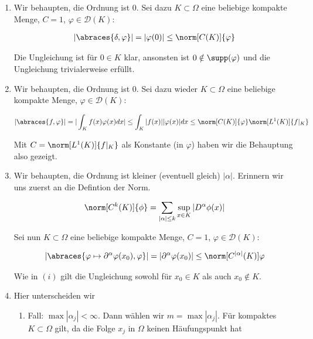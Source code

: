 \begin{solution}

\begin{enumerate}[label = (\roman*)]
  \item Wir behaupten, die Ordnung ist $0$. Sei dazu $K \subset \Omega$ eine beliebige kompakte Menge, $C=1$, $\varphi \in \mathcal{D}(K)$:

  \begin{align*}
    |\abraces{\delta, \varphi}|
    = |\varphi(0)|
    \leq
    \norm[C(K)]{\varphi}
  \end{align*}

  Die Ungleichung ist für $0 \in K$ klar, ansonsten ist $0 \notin \supp(\varphi)$ und die Ungleichung trivialerweise erfüllt.


  \item Wir behaupten, die Ordnung ist $0$. Sei dazu wieder $K \subset \Omega$ eine beliebige kompakte Menge, $\varphi \in \mathcal{D}(K)$:

  \begin{align*}
      |\abraces{f, \varphi}|
      =
      |\int_K f(x) \varphi(x) dx|
      \leq
      \int_K |f(x)| |\varphi(x)| dx
      \leq
      \norm[C(K)]{\varphi} \norm[L^1 (K)]{f|_K}
  \end{align*}

  Mit $C = \norm[L^1 (K)]{f|_K}$ als Konstante (in $\varphi$) haben wir die Behauptung also gezeigt.

  \item Wir behaupten, die Ordnung ist kleiner (eventuell gleich) $|\alpha|$.
  Erinnern wir uns zuerst an die Defintion der Norm.

  \begin{align*}
    \norm[C^k (K)]{\phi}
    =
    \sum_{|\alpha| \leq k} \sup_{x \in K} |D^\alpha \phi(x)|
  \end{align*}

  Sei nun $K \subset \Omega$ eine beliebige kompakte Menge, $C = 1$, $\varphi \in \mathcal{D}(K)$:

  \begin{align*}
    |\abraces{\varphi \mapsto \partial^\alpha \varphi(x_0), \varphi}|
    =
    |\partial^\alpha \varphi(x_0)|
    \leq
    \norm[C^{|\alpha|}(K)]{\varphi}
  \end{align*}

  Wie in $(i)$ gilt die Ungleichung sowohl für $x_0 \in K$ als auch $x_0 \notin K$.

  \item Hier unterscheiden wir
  \begin{enumerate}[label = \arabic*.]
    \item Fall: $\max |\alpha_j| < \infty$. Dann wählen wir $m = \max |\alpha_j|$.
    Für kompaktes $K \subset \Omega$ gilt, da die Folge $x_j$ in $\Omega$ keinen Häufungspunkt hat


\end{enumerate}
\end{enumerate}
\end{solution}
